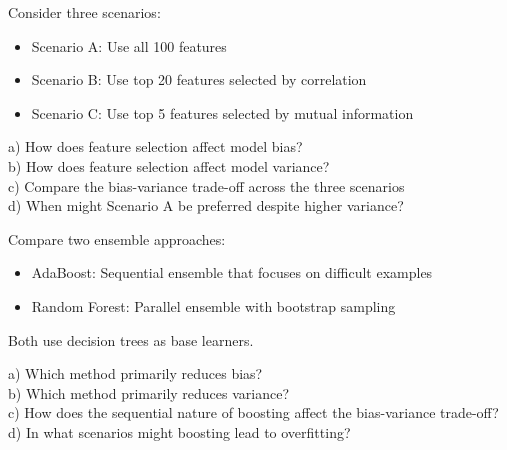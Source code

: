 \documentclass{article}
\newcounter{exercise}
\begin{document}
\begin{tcolorbox}[colback=gray!5!white,colframe=gray!75!black,title=Problem \stepcounter{exercise}: Feature Selection Impact]

Consider three scenarios:
\begin{itemize}
    \item Scenario A: Use all 100 features
    \item Scenario B: Use top 20 features selected by correlation
    \item Scenario C: Use top 5 features selected by mutual information
\end{itemize}

a) How does feature selection affect model bias?\\
b) How does feature selection affect model variance?\\
c) Compare the bias-variance trade-off across the three scenarios\\
d) When might Scenario A be preferred despite higher variance?
\end{tcolorbox}

\begin{tcolorbox}[colback=gray!5!white,colframe=gray!75!black,title=Problem \stepcounter{exercise}: Boosting vs Bagging]

Compare two ensemble approaches:
\begin{itemize}
    \item AdaBoost: Sequential ensemble that focuses on difficult examples
    \item Random Forest: Parallel ensemble with bootstrap sampling
\end{itemize}

Both use decision trees as base learners.

a) Which method primarily reduces bias?\\
b) Which method primarily reduces variance?\\
c) How does the sequential nature of boosting affect the bias-variance trade-off?\\
d) In what scenarios might boosting lead to overfitting?
\end{tcolorbox}
\end{document}
